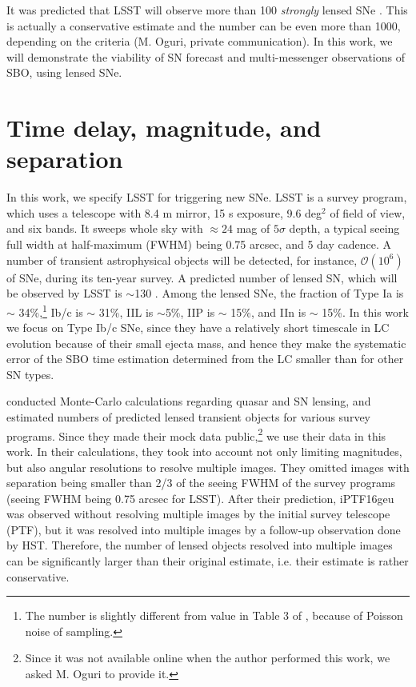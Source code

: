 \documentclass[useAMS,usenatbib,twocolumn]{mnras}
\begin{document}
It was predicted that LSST will observe more than 100 {\it strongly}
lensed SNe \citep{ogur10}. This is actually a conservative estimate
and the number can be even more than 1000, depending on the criteria
(M. Oguri, private communication). In this work, we will demonstrate
the viability of SN forecast and multi-messenger observations of SBO,
using lensed SNe.

\section{Time delay, magnitude, and separation}
\label{sec:time_delay}

In this work, we specify LSST for triggering new SNe. LSST is a survey
program, which uses a telescope with 8.4 m mirror, 15 s exposure, 9.6
deg$^2$ of field of view, and six bands. It sweeps whole sky with
$\approx 24$ mag of $5\sigma$ depth, a typical seeing full width at
half-maximum (FWHM) being 0.75 arcsec, and 5 day cadence. A number of
transient astrophysical objects will be detected, for instance,
$\mathcal{O}(10^6)$ of SNe, during its ten-year survey.  A predicted
number of lensed SN, which will be observed by LSST is $\sim$130
\citep{ogur10}. Among the lensed SNe, the fraction of Type Ia is
$\sim$ 34\%,\footnote{The number is slightly different from value in
  Table 3 of \citet{ogur10}, because of Poisson noise of sampling.}
Ib/c is $\sim$ 31\%, IIL is $\sim$5\%, IIP is $\sim$ 15\%, and IIn is
$\sim$ 15\%.  In this work we focus on Type Ib/c SNe, since they have
a relatively short timescale in LC evolution because of their small
ejecta mass, and hence they make the systematic error of the SBO time
estimation determined from the LC smaller than for other SN types.

\cite{ogur10} conducted Monte-Carlo calculations regarding quasar and
SN lensing, and estimated numbers of predicted lensed transient
objects for various survey programs. Since they made their mock data
public,\footnote{Since it was not available online when the author
  performed this work, we asked M. Oguri to provide it.} we use their
data in this work. In their calculations, they took into account not
only limiting magnitudes, but also angular resolutions to resolve
multiple images. They omitted images with separation being smaller
than 2/3 of the seeing FWHM of the survey programs (seeing FWHM being
0.75 arcsec for LSST).  After their prediction, iPTF16geu was observed
without resolving multiple images by the initial survey telescope
(PTF), but it was resolved into multiple images by a follow-up
observation done by HST. Therefore, the number of lensed objects
resolved into multiple images can be significantly larger than their
original estimate, i.e. their estimate is rather conservative.
\end{document}

